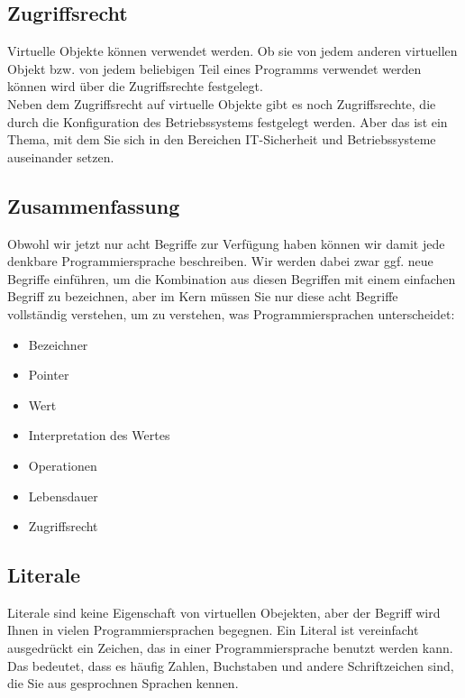 \subsection{Zugriffsrecht}

Virtuelle Objekte können verwendet werden. Ob sie von jedem anderen virtuellen Objekt bzw. von jedem beliebigen Teil eines Programms verwendet werden können wird über die Zugriffsrechte festgelegt.\\

Neben dem Zugriffsrecht auf virtuelle Objekte gibt es noch Zugriffsrechte, die durch die Konfiguration des Betriebssystems festgelegt werden. Aber das ist ein Thema, mit dem Sie sich in den Bereichen IT-Sicherheit und Betriebssysteme auseinander setzen.

\subsection{Zusammenfassung}

Obwohl wir jetzt nur acht Begriffe zur Verfügung haben können wir damit jede denkbare Programmiersprache beschreiben. Wir werden dabei zwar ggf. neue Begriffe einführen, um die Kombination aus diesen Begriffen mit einem einfachen Begriff zu bezeichnen, aber im Kern müssen Sie nur diese acht Begriffe vollständig verstehen, um zu verstehen, was Programmiersprachen unterscheidet:

\begin{itemize}
	\item Bezeichner
	\item Pointer
	\item Wert
	\item Interpretation des Wertes
	\item Operationen
	\item Lebensdauer
	\item Zugriffsrecht
\end{itemize}

\subsection{Literale}

Literale sind keine Eigenschaft von virtuellen Obejekten, aber der Begriff wird Ihnen in vielen Programmiersprachen begegnen. Ein Literal ist vereinfacht ausgedrückt ein Zeichen, das in einer Programmiersprache benutzt werden kann. Das bedeutet, dass es häufig Zahlen, Buchstaben und andere Schriftzeichen sind, die Sie aus gesprochnen Sprachen kennen.\\


